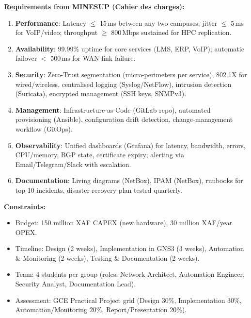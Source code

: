 \documentclass[11pt]{article}
\begin{document}
\begin{experience}
\medskip
\textbf{Requirements from MINESUP (Cahier des charges):}
\begin{enumerate}
    \item \textbf{Performance}: Latency $\le$ 15\,ms between any two campuses; jitter $\le$ 5\,ms for VoIP/video; throughput $\ge$ 800\,Mbps sustained for HPC replication.
    \item \textbf{Availability}: 99.99\% uptime for core services (LMS, ERP, VoIP); automatic failover $<$ 500\,ms for WAN link failure.
    \item \textbf{Security}: Zero-Trust segmentation (micro-perimeters per service), 802.1X for wired/wireless, centralised logging (Syslog/NetFlow), intrusion detection (Suricata), encrypted management (SSH keys, SNMPv3).
    \item \textbf{Management}: Infrastructure-as-Code (GitLab repo), automated provisioning (Ansible), configuration drift detection, change-management workflow (GitOps).
    \item \textbf{Observability}: Unified dashboards (Grafana) for latency, bandwidth, errors, CPU/memory, BGP state, certificate expiry; alerting via Email/Telegram/Slack with escalation.
    \item \textbf{Documentation}: Living diagrams (NetBox), IPAM (NetBox), runbooks for top 10 incidents, disaster-recovery plan tested quarterly.
\end{enumerate}

\medskip
\textbf{Constraints:}
\begin{itemize}
    \item Budget: 150 million XAF CAPEX (new hardware), 30 million XAF/year OPEX.
    \item Timeline: Design (2 weeks), Implementation in GNS3 (3 weeks), Automation \& Monitoring (2 weeks), Testing \& Documentation (2 weeks).
    \item Team: 4 students per group (roles: Network Architect, Automation Engineer, Security Analyst, Documentation Lead).
    \item Assessment: GCE Practical Project grid (Design 30\%, Implementation 30\%, Automation/Monitoring 20\%, Report/Presentation 20\%).
\end{itemize}
\end{experience}
\end{document}
